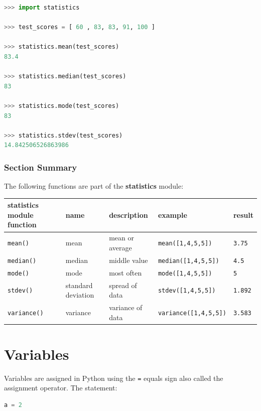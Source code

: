 \documentclass{book}
\begin{document}
\begin{lstlisting}[language=Python]
>>> import statistics
    
>>> test_scores = [ 60 , 83, 83, 91, 100 ]
    
>>> statistics.mean(test_scores)
83.4

>>> statistics.median(test_scores)
83

>>> statistics.mode(test_scores)
83
    
>>> statistics.stdev(test_scores)
14.842506526863986 
\end{lstlisting}
    




    
        \subsubsection{Section Summary}\label{section-summary}

The following functions are part of the \textbf{statistics} module:

\begin{longtable}[]{@{}lllll@{}}
\toprule
statistics module function & name & description & example &
result\tabularnewline
\midrule
\endhead
\lstinline!mean()! & mean & mean or average &
\lstinline!mean([1,4,5,5])! & \lstinline!3.75!\tabularnewline
\lstinline!median()! & median & middle value &
\lstinline!median([1,4,5,5])! & \lstinline!4.5!\tabularnewline
\lstinline!mode()! & mode & most often & \lstinline!mode([1,4,5,5])! &
\lstinline!5!\tabularnewline
\lstinline!stdev()! & standard deviation & spread of data &
\lstinline!stdev([1,4,5,5])! & \lstinline!1.892!\tabularnewline
\lstinline!variance()! & variance & variance of data &
\lstinline!variance([1,4,5,5])! & \lstinline!3.583!\tabularnewline
\bottomrule
\end{longtable}
    




    
        \section{Variables}\label{variables}
    




    
        Variables are assigned in Python using the \lstinline!=! equals sign
also called the assignment operator. The statement:

\begin{lstlisting}[language=Python]
a = 2
\end{lstlisting}
\end{document}
